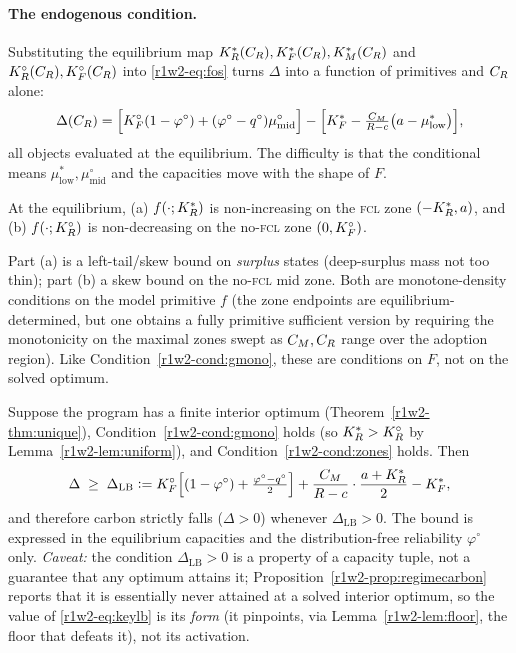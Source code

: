 \paragraph{The endogenous condition.}
Substituting the equilibrium map $K_R^{*}(C_R),K_F^{*}(C_R),K_M^{*}(C_R)$ and
$K_R^{\circ}(C_R),K_F^{\circ}(C_R)$ into \eqref{r1w2-eq:fos} turns $\Delta$ into a
function of primitives and $C_R$ alone:
\begin{equation}\label{r1w2-eq:endo}
  \Delta(C_R)=\Big[K_F^{\circ}(1-\varphi^{\circ})+(\varphi^{\circ}-q^{\circ})\mu^{\circ}_{\mathrm{mid}}\Big]
  -\Big[K_F^{*}-\tfrac{C_M}{R-c}\big(a-\mu^{*}_{\mathrm{low}}\big)\Big],
\end{equation}
all objects evaluated at the equilibrium. The difficulty is that the conditional
means $\mu^{*}_{\mathrm{low}},\mu^{\circ}_{\mathrm{mid}}$ and the capacities move
with the shape of $F$.

\begin{condition}\label{r1w2-cond:zones}
At the equilibrium, (a) $f(\cdot;K_R^{*})$ is non-increasing on the \textsc{fcl} zone
$(-K_R^{*},a)$, and (b) $f(\cdot;K_R^{\circ})$ is non-decreasing on the no-\textsc{fcl} zone
$(0,K_F^{\circ})$.
\end{condition}

Part (a) is a left-tail/skew bound on \emph{surplus} states (deep-surplus mass
not too thin); part (b) a skew bound on the no-\textsc{fcl} mid zone. Both are
monotone-density conditions on the model primitive $f$ (the zone endpoints are
equilibrium-determined, but one obtains a fully primitive sufficient version by
requiring the monotonicity on the maximal zones swept as $C_M,C_R$ range over the
adoption region). Like Condition~\ref{r1w2-cond:gmono}, these are conditions on $F$, not
on the solved optimum.

\begin{theorem}\label{r1w2-thm:keystone}
Suppose the program has a finite interior optimum (Theorem~\ref{r1w2-thm:unique}),
Condition~\ref{r1w2-cond:gmono} holds (so $K_R^{*}>K_R^{\circ}$ by Lemma~\ref{r1w2-lem:uniform}), and
Condition~\ref{r1w2-cond:zones} holds. Then
\begin{equation}\label{r1w2-eq:keylb}
  \Delta\;\ge\;\Delta_{\mathrm{LB}}
  \vcentcolon= K_F^{\circ}\Big[(1-\varphi^{\circ})+\tfrac{\varphi^{\circ}-q^{\circ}}{2}\Big]
  +\frac{C_M}{R-c}\cdot\frac{a+K_R^{*}}{2}-K_F^{*} ,
\end{equation}
and therefore carbon strictly falls ($\Delta>0$) whenever
$\Delta_{\mathrm{LB}}>0$. The bound is expressed in the equilibrium capacities and
the distribution-free reliability $\varphi^{\circ}$ only. \emph{Caveat:} the
condition $\Delta_{\mathrm{LB}}>0$ is a property of a capacity tuple, not a
guarantee that any optimum attains it; Proposition~\ref{r1w2-prop:regimecarbon} reports
that it is essentially never attained at a solved interior optimum, so the value of
\eqref{r1w2-eq:keylb} is its \emph{form} (it pinpoints, via Lemma~\ref{r1w2-lem:floor}, the
floor that defeats it), not its activation.
\end{theorem}

